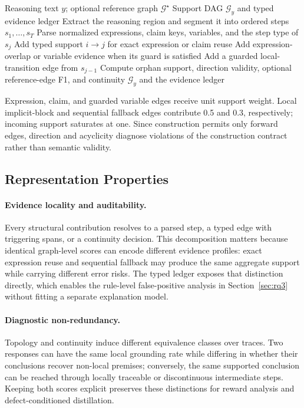 \begin{algorithm}[H]
\small
\caption{Surface-evidenced support graph construction}
\label{alg:dag}
\label{alg:topoprm}
\begin{algorithmic}[1]
\Require Reasoning text $y$; optional reference graph $\mathcal{G}^{\star}$
\Ensure Support DAG $\mathcal{G}_y$ and typed evidence ledger
\State Extract the reasoning region and segment it into ordered steps $s_1,\ldots,s_T$
  \State Parse normalized expressions, claim keys, variables, and the step type of $s_j$
    \State Add typed support $i\!\to\!j$ for exact expression or claim reuse
    \State Add expression-overlap or variable evidence when its guard is satisfied
  \EndFor
    \State Add a guarded local-transition edge from $s_{j-1}$
  \EndIf
\EndFor
\State Compute orphan support, direction validity, optional reference-edge F1, and continuity
\State \Return $\mathcal{G}_y$ and the evidence ledger
\end{algorithmic}
\end{algorithm}

Expression, claim, and guarded variable edges receive unit support weight. Local implicit-block and sequential fallback edges contribute 0.5 and 0.3, respectively; incoming support saturates at one. Since construction permits only forward edges, direction and acyclicity diagnose violations of the construction contract rather than semantic validity.

\subsection{Representation Properties}
\paragraph{Evidence locality and auditability.}
Every structural contribution resolves to a parsed step, a typed edge with triggering spans, or a continuity decision. This decomposition matters because identical graph-level scores can encode different evidence profiles: exact expression reuse and sequential fallback may produce the same aggregate support while carrying different error risks. The typed ledger exposes that distinction directly, which enables the rule-level false-positive analysis in Section~\ref{sec:rq3} without fitting a separate explanation model.

\paragraph{Diagnostic non-redundancy.}
Topology and continuity induce different equivalence classes over traces. Two responses can have the same local grounding rate while differing in whether their conclusions recover non-local premises; conversely, the same supported conclusion can be reached through locally traceable or discontinuous intermediate steps. Keeping both scores explicit preserves these distinctions for reward analysis and defect-conditioned distillation.

